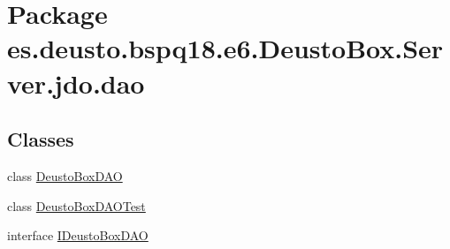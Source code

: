 \hypertarget{namespacees_1_1deusto_1_1bspq18_1_1e6_1_1_deusto_box_1_1_server_1_1jdo_1_1dao}{}\section{Package es.\+deusto.\+bspq18.\+e6.\+Deusto\+Box.\+Server.\+jdo.\+dao}
\label{namespacees_1_1deusto_1_1bspq18_1_1e6_1_1_deusto_box_1_1_server_1_1jdo_1_1dao}
\subsection*{Classes}
\begin{DoxyCompactItemize}
\item 
class \mbox{\hyperlink{classes_1_1deusto_1_1bspq18_1_1e6_1_1_deusto_box_1_1_server_1_1jdo_1_1dao_1_1_deusto_box_d_a_o}{Deusto\+Box\+D\+AO}}
\item 
class \mbox{\hyperlink{classes_1_1deusto_1_1bspq18_1_1e6_1_1_deusto_box_1_1_server_1_1jdo_1_1dao_1_1_deusto_box_d_a_o_test}{Deusto\+Box\+D\+A\+O\+Test}}
\item 
interface \mbox{\hyperlink{interfacees_1_1deusto_1_1bspq18_1_1e6_1_1_deusto_box_1_1_server_1_1jdo_1_1dao_1_1_i_deusto_box_d_a_o}{I\+Deusto\+Box\+D\+AO}}
\end{DoxyCompactItemize}
